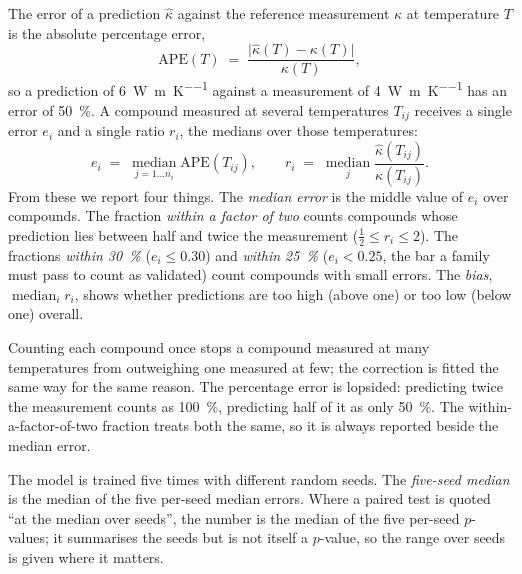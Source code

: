 The error of a prediction $\hat{\kappa}$ against the reference measurement $\kappa$ at temperature
$T$ is the absolute percentage error,
%
\begin{equation}
  \mathrm{APE}(T) \;=\; \frac{\bigl|\hat{\kappa}(T) - \kappa(T)\bigr|}{\kappa(T)},
  \label{eq:ape}
\end{equation}
%
so a prediction of \SI{6}{\watt\per\meter\per\kelvin} against a measurement of
\SI{4}{\watt\per\meter\per\kelvin} has an error of \SI{50}{\percent}. A compound measured at several
temperatures $T_{ij}$ receives a single error $e_i$ and a single ratio $r_i$, the medians over those
temperatures:
%
\begin{equation}
  e_i \;=\; \operatorname*{median}_{j=1\ldots n_i} \mathrm{APE}(T_{ij}),
  \qquad
  r_i \;=\; \operatorname*{median}_{j} \frac{\hat{\kappa}(T_{ij})}{\kappa(T_{ij})}.
  \label{eq:err}
\end{equation}
%
From these we report four things. The \emph{median error} is the middle value of $e_i$ over
compounds. The fraction \emph{within a factor of two} counts compounds whose prediction lies between
half and twice the measurement ($\tfrac{1}{2} \le r_i \le 2$). The fractions \emph{within
\SI{30}{\percent}} ($e_i \le 0.30$) and \emph{within \SI{25}{\percent}} ($e_i < 0.25$, the bar a
family must pass to count as validated) count compounds with small errors. The \emph{bias},
$\operatorname{median}_i r_i$, shows whether predictions are too high (above one) or too low (below
one) overall.

Counting each compound once stops a compound measured at many temperatures from outweighing one
measured at few; the correction is fitted the same way for the same reason. The percentage error is
lopsided: predicting twice the measurement counts as \SI{100}{\percent}, predicting half of it as
only \SI{50}{\percent}. The within-a-factor-of-two fraction treats both the same, so it is always
reported beside the median error.

The model is trained five times with different random seeds. The \emph{five-seed median} is the
median of the five per-seed median errors. Where a paired test is quoted ``at the median over
seeds'', the number is the median of the five per-seed $p$-values; it summarises the seeds but is not
itself a $p$-value, so the range over seeds is given where it matters.
